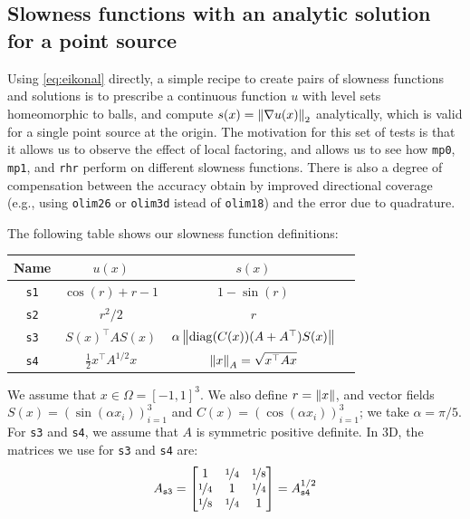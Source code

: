 \documentclass[sisc-eikonal.tex]{subfiles}
\begin{document}
\subsection[Single point source]{Slowness functions with an analytic
  solution for a point source}\label{ssec:point-source-problems}

Using \cref{eq:eikonal} directly, a simple recipe to create pairs of
slowness functions and solutions is to prescribe a continuous function
$u$ with level sets homeomorphic to balls, and compute
$s(x) = \left\|\nabla u(x)\right\|_2$ analytically, which is valid for a
single point source at the origin. The motivation for this set of
tests is that it allows us to observe the effect of local factoring,
and allows us to see how \texttt{mp0}, \texttt{mp1}, and \texttt{rhr}
perform on different slowness functions. There is also a degree of
compensation between the accuracy obtain by improved directional
coverage (e.g., using \texttt{olim26} or \texttt{olim3d} istead of
\texttt{olim18}) and the error due to quadrature.

The following table shows our slowness function definitions:
\vspace{0.5em}
\begin{center}
  \begin{tabular}{cccc}
    Name & $u(x)$ & $s(x)$ \\
    \midrule
    \texttt{s1} & $\cos(r) + r - 1$ & $1 - \sin(r)$ \\
    \texttt{s2} & $r^2/2$ & $r$ \\
    \texttt{s3} & $S(x)^\top A S(x)$ & $\alpha\left\|\operatorname{diag}(C(x)){(A + A^\top)}S(x)\right\|$ \\
    \texttt{s4} & $\tfrac{1}{2} x^\top A^{1/2} x$ & $\left\|x\right\|_A = \sqrt{x^\top A x}$
  \end{tabular}
\end{center}
\vspace{0.5em} We assume that $x \in \Omega = [-1, 1]^3$. We also
define $r = \left\|x\right\|$, and vector fields
$S(x) = (\sin(\alpha x_i))_{i=1}^3$ and
$C(x) = (\cos(\alpha x_i))_{i=1}^3$; we take $\alpha = \pi/5$. For
\texttt{s3} and \texttt{s4}, we assume that $A$ is symmetric positive
definite. In 3D, the matrices we use for \texttt{s3} and \texttt{s4}
are:\begin{equation} A_{\texttt{s3}} = \begin{bmatrix}
    1 & \nicefrac{1}{4} & \nicefrac{1}{8} \\
    \nicefrac{1}{4} & 1 & \nicefrac{1}{4} \\
    \nicefrac{1}{8} & \nicefrac{1}{4} & 1
  \end{bmatrix} = A_{\texttt{s4}}^{1/2}
\end{equation}
\end{document}
